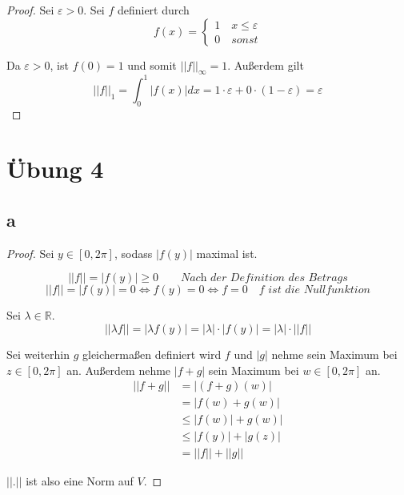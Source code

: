 \documentclass[10pt,a4paper]{article}
\begin{document}
\begin{proof}
Sei $\varepsilon > 0$.
Sei $f$ definiert durch
\begin{equation}
f(x) =
\begin{cases}
1 \quad \textit{$x \le \varepsilon$}\\
0 \quad \textit{sonst}
\end{cases}
\end{equation}

Da $\varepsilon > 0$, ist $f(0) = 1$ und somit $||f||_{\infty} = 1$.
Außerdem gilt
\begin{equation}
||f||_{1} = \int_{0}^{1} |f(x)| dx = 1 \cdot \varepsilon + 0 \cdot (1 - \varepsilon) = \varepsilon
\end{equation}
\end{proof}

\section*{Übung 4}

\subsection*{a}

\begin{proof}
Sei $y \in [0, 2\pi]$, sodass $|f(y)|$ maximal ist.

\begin{equation}
||f|| = |f(y)| \ge 0 \qquad \textit{Nach der Definition des Betrags}
\end{equation}
\begin{equation}
||f|| = |f(y)| = 0 \Leftrightarrow f(y) = 0 \Leftrightarrow f = 0 \quad \textit{$f$ ist die Nullfunktion}
\end{equation}

Sei $\lambda \in \mathbb{R}$.
\begin{equation}
||\lambda f|| = |\lambda f(y)| = |\lambda| \cdot |f(y)| = |\lambda| \cdot ||f||
\end{equation}

Sei weiterhin $g$ gleichermaßen definiert wird $f$ und $|g|$ nehme sein Maximum bei $z \in [0, 2\pi]$ an.
Außerdem nehme $|f + g|$ sein Maximum bei $w \in [0, 2\pi]$ an.
\begin{align}
||f + g|| & = |(f + g)(w)|\\
& = |f(w) + g(w)|\\
& \le |f(w)| + g(w)|\\
& \le |f(y)| + |g(z)|\\
& = ||f|| + ||g||
\end{align}

$||.||$ ist also eine Norm auf $V$.
\end{proof}
\end{document}
